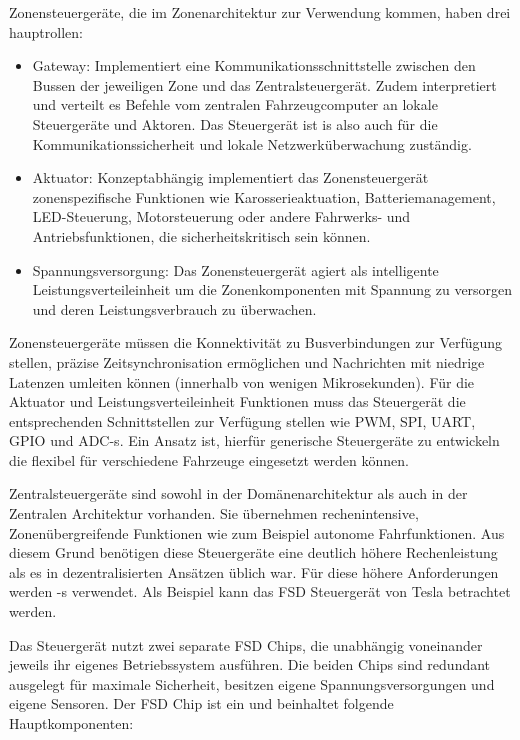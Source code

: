 Zonensteuergeräte, die im Zonenarchitektur zur Verwendung kommen, haben drei hauptrollen:
	\begin{itemize}
		\item Gateway: Implementiert eine Kommunikationsschnittstelle zwischen den Bussen der jeweiligen Zone und das Zentralsteuergerät.  Zudem interpretiert und verteilt es Befehle vom zentralen Fahrzeugcomputer an lokale Steuergeräte und Aktoren. Das Steuergerät ist is also auch für die Kommunikationssicherheit und lokale Netzwerküberwachung zuständig. 
		\item Aktuator: Konzeptabhängig implementiert das Zonensteuergerät zonenspezifische Funktionen wie Karosserieaktuation, Batteriemanagement, LED-Steuerung, Motorsteuerung oder andere Fahrwerks- und Antriebsfunktionen, die sicherheitskritisch sein können. 
		\item Spannungsversorgung: Das Zonensteuergerät agiert als intelligente Leistungsverteileinheit um die Zonenkomponenten mit Spannung zu versorgen und deren Leistungsverbrauch zu überwachen. 
	\end{itemize} \cite{Heurtefeux2021}

Zonensteuergeräte müssen die Konnektivität zu Busverbindungen zur Verfügung stellen, präzise Zeitsynchronisation ermöglichen und Nachrichten mit niedrige Latenzen umleiten können (innerhalb von wenigen Mikrosekunden). Für die Aktuator und Leistungsverteileinheit Funktionen muss das Steuergerät die entsprechenden Schnittstellen zur Verfügung stellen wie PWM, SPI, UART, GPIO und ADC-s. Ein Ansatz ist, hierfür generische Steuergeräte zu entwickeln die flexibel für verschiedene Fahrzeuge eingesetzt werden können.\cite{Maier2023}

Zentralsteuergeräte sind sowohl in der Domänenarchitektur als auch in der Zentralen Architektur vorhanden. Sie übernehmen rechenintensive, Zonenübergreifende Funktionen wie zum Beispiel autonome Fahrfunktionen. Aus diesem Grund benötigen diese Steuergeräte eine deutlich höhere Rechenleistung als es in dezentralisierten Ansätzen üblich war. Für diese höhere Anforderungen werden -s verwendet. Als Beispiel kann das FSD Steuergerät von Tesla betrachtet werden. 

Das Steuergerät nutzt zwei separate FSD Chips, die unabhängig voneinander jeweils ihr eigenes Betriebssystem ausführen. Die beiden Chips sind redundant ausgelegt für maximale Sicherheit, besitzen eigene Spannungsversorgungen und eigene Sensoren. Der FSD Chip ist ein  und beinhaltet folgende Hauptkomponenten:

